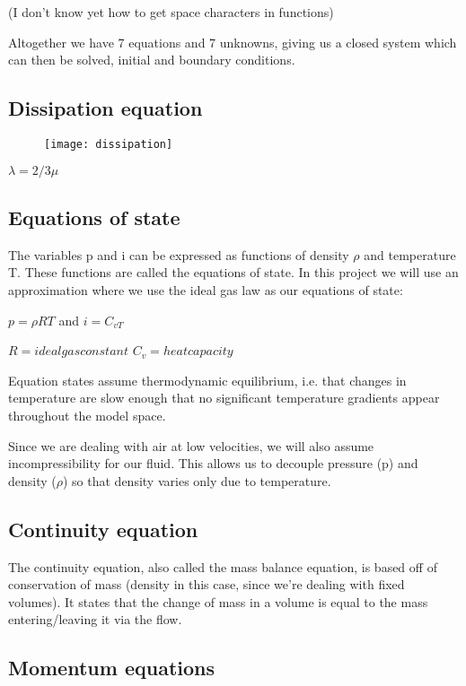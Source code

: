 (I don't know yet how to get space characters in functions)

Altogether we have 7 equations and 7 unknowns, giving us a closed system which can then be solved, initial and boundary conditions.

\subsection{Dissipation equation}

\begin{figure}[h]
\texttt{[image: dissipation]}
\end{figure}
$\lambda = 2/3\mu$\\

\subsection{Equations of state}

The variables p and i  can be expressed as functions of density $\rho$ and temperature T. These functions are called the equations of state. In this project we will use an approximation where we use the ideal gas law as our equations of state:

$p = \rho RT$  and $i = C_{vT}$

$R = ideal gas constant$
$C_v = heat capacity$

Equation states assume thermodynamic equilibrium, i.e. that changes in temperature are slow enough that no significant temperature gradients appear throughout the model space.

Since we are dealing with air at low velocities, we will also assume incompressibility for our fluid. This allows us to decouple pressure (p) and density ($\rho$) so that density varies only due to temperature. 

\subsection{Continuity equation}

The continuity equation, also called the mass balance equation, is based off of conservation of mass (density in this case, since we're dealing with fixed volumes). It states that the change of mass in a volume is equal to the mass entering/leaving it via the flow.

\subsection{Momentum equations}


